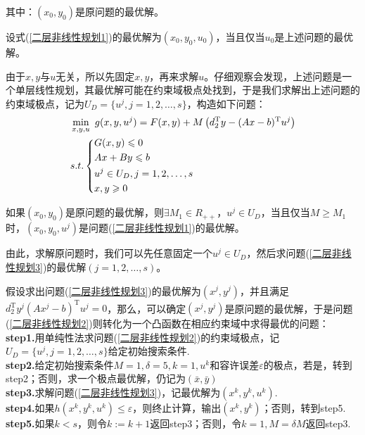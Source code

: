             其中：$(x_0,y_0)$是原问题的最优解。
        \begin{theorem}
        设式(\ref{二层非线性规划1})的最优解为$(x_0,y_0,u_0)$，当且仅当$u_0$是上述问题的最优解。
        \end{theorem}
        \par
        由于$x,y$与$u$无关，所以先固定$x,y$，再来求解$u$。仔细观察会发现，上述问题是一个单层线性规划，其最优解可能在约束域极点处找到，于是我们求解出上述问题的约束域极点，记为$U_D=\{u^j,j=1,2,\ldots,s\}$，构造如下问题：
        \begin{align}
        \label{二层非线性规划3}
        &\mathop{\min}\limits_{x,y,u}\ g(x,y,u^j)=F(x,y)+M\left(d_2^\mathrm{T} y-(Ax-b)^\mathrm{T} u^j\right) \\
        &s.t.\left\{
        \begin{aligned}
         & G(x,y)\leqslant 0\notag \\
         & Ax+By \leqslant b\\
         & u^j\in U_D,j=1,2,\ldots,s\notag \\
         & x,y \geqslant 0\notag
        \end{aligned}
        \right.
        \end{align}
        \begin{theorem}
        如果$(x_0,y_0)$是原问题的最优解，则$\exists M_1\in R_{++}$，$u^j\in U_D$，当且仅当$M\geqslant M_1$时，$(x_0,y_0,u^j)$是问题(\ref{二层非线性规划1})的最优解。
        \end{theorem}
        \par
        由此，求解原问题时，我们可以先任意固定一个$u^j\in U_D$，然后求问题(\ref{二层非线性规划3})的最优解$(j=1,2,\ldots,s)$。
        \par
        假设求出问题(\ref{二层非线性规划3})的最优解为$(x^j,y^j)$，并且满足$d_2^\mathrm{T} y^j(Ax^j-b)^\mathrm{T} u^j=0$，那么，可以确定$(x^j,y^j)$是原问题的最优解，于是问题(\ref{二层非线性规划2})则转化为一个凸函数在相应约束域中求得最优的问题：\\
        \textbf{step1.}用单纯性法求问题(\ref{二层非线性规划2})的约束域极点，记$U_D=\{u^j,j=1,2,\ldots,s\}$给定初始搜索条件.\\
        \textbf{step2.}给定初始搜索条件$M=1,\delta =5,k=1,u^k$和容许误差$\varepsilon$的极点，若是，转到step2；否则，求一个极点最优解，仍记为$(\bar{x},\bar{y})$\\
        \textbf{step3.}求解问题(\ref{二层非线性规划3})，记最优解为$(x^k,y^k,u^k)$.\\
        \textbf{step4.}如果$h(x^k,y^k,u^k)\leqslant \varepsilon$，则终止计算，输出$(x^k,y^k)$；否则，转到step5.\\
        \textbf{step5.}如果$k<s$，则令$k:=k+1$返回step3；否则，令$k=1,M=\delta M$返回step3.
